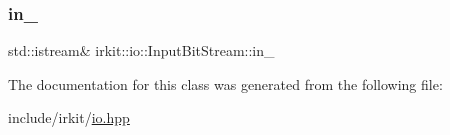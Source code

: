 \mbox{\label{classirkit_1_1io_1_1InputBitStream_a351a1f4be11c5b3bd34e5ed4e2885ebe}} 
\subsubsection{\texorpdfstring{in\+\_\+}{in\_}}
{\footnotesize\ttfamily std\+::istream\& irkit\+::io\+::\+Input\+Bit\+Stream\+::in\+\_\+\hspace{0.3cm}{\ttfamily [protected]}}



The documentation for this class was generated from the following file\+:\begin{DoxyCompactItemize}
\item 
include/irkit/\mbox{\hyperlink{io_8hpp}{io.\+hpp}}\end{DoxyCompactItemize}
